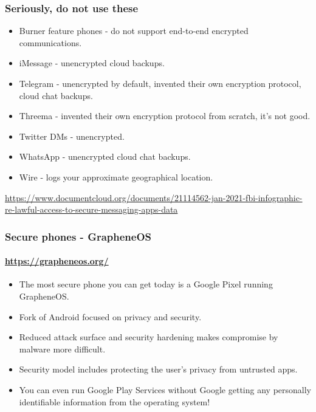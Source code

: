 \documentclass[aspectratio=169,usenames,dvipsnames]{beamer}
\begin{document}
\begin{frame}
  \frametitle{Seriously, do not use these}

  \begin{itemize}[<+->]
    \item Burner feature phones - do not support end-to-end encrypted
      communications.
    \item iMessage - unencrypted cloud backups.
    \item Telegram - unencrypted by default, invented their own encryption
      protocol, cloud chat backups.
    \item Threema - invented their own encryption protocol from scratch, it's
      not good.
    \item Twitter DMs - unencrypted.
    \item WhatsApp - unencrypted cloud chat backups.
    \item Wire - logs your approximate geographical location.
  \end{itemize}

  \vfill \centering \footnotesize

  \url{https://www.documentcloud.org/documents/21114562-jan-2021-fbi-infographic-re-lawful-access-to-secure-messaging-apps-data}

\end{frame}

\begin{frame}
  \frametitle{Secure phones - GrapheneOS}
  \framesubtitle{\url{https://grapheneos.org/}}

  \begin{itemize}[<+->]
    \item The most secure phone you can get today is a Google Pixel running
      GrapheneOS.
    \item Fork of Android focused on privacy and security.
    \item Reduced attack surface and security hardening makes compromise
      by malware more difficult.
    \item Security model includes protecting the user's privacy from untrusted
      apps.
    \item You can even run Google Play Services without Google getting any
      personally identifiable information from the operating system!
  \end{itemize}
\end{frame}
\end{document}
